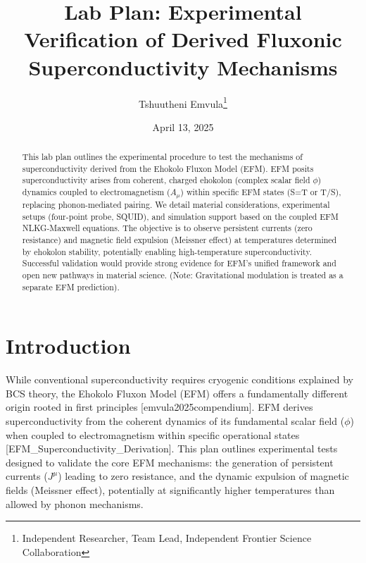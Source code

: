 \documentclass[a4paper,12pt]{article}
\title{Lab Plan: Experimental Verification of Derived Fluxonic Superconductivity Mechanisms} %
\author{Tshuutheni Emvula\thanks{Independent Researcher, Team Lead, Independent Frontier Science Collaboration}}
\date{April 13, 2025} %
\newcommand{\citepaper}[1]{[#1]} %
\begin{document}
\maketitle

\begin{abstract}
This lab plan outlines the experimental procedure to test the mechanisms of superconductivity derived from the Ehokolo Fluxon Model (EFM). EFM posits superconductivity arises from coherent, charged ehokolon (complex scalar field \(\phi\)) dynamics coupled to electromagnetism (\(A_\mu\)) within specific EFM states (S=T or T/S), replacing phonon-mediated pairing. We detail material considerations, experimental setups (four-point probe, SQUID), and simulation support based on the coupled EFM NLKG-Maxwell equations. The objective is to observe persistent currents (zero resistance) and magnetic field expulsion (Meissner effect) at temperatures determined by ehokolon stability, potentially enabling high-temperature superconductivity. Successful validation would provide strong evidence for EFM's unified framework and open new pathways in material science. (Note: Gravitational modulation is treated as a separate EFM prediction).
\end{abstract}

\section{Introduction}
While conventional superconductivity requires cryogenic conditions explained by BCS theory, the Ehokolo Fluxon Model (EFM) offers a fundamentally different origin rooted in first principles \citepaper{emvula2025compendium}. EFM derives superconductivity from the coherent dynamics of its fundamental scalar field (\(\phi\)) when coupled to electromagnetism within specific operational states \citepaper{EFM_Superconductivity_Derivation}. This plan outlines experimental tests designed to validate the core EFM mechanisms: the generation of persistent currents (\(J^\mu\)) leading to zero resistance, and the dynamic expulsion of magnetic fields (Meissner effect), potentially at significantly higher temperatures than allowed by phonon mechanisms.
\end{document}
